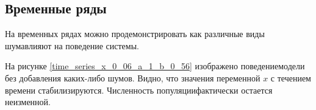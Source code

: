 \subsection{Временные ряды}

    На временных рядах можно продемонстрировать как различные виды шумавлияют на поведение системы.

    На рисунке \ref{time_series_x_0_06_a_1_b_0_56} изображено поведениемодели без добавления каких-либо шумов. Видно, что значения переменной \(x\) с течением времени стабилизируются. Численность популяциифактически остается неизменной.

    \begin{figure}
        \centering


\end{figure}
